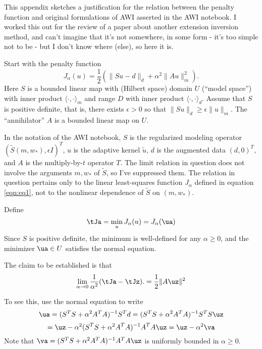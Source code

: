 This appendix sketches a justification for the relation between the penalty function and original formulations of AWI asserted in the AWI notebook. I worked this out for the review of a paper about another extension inversion method, and can't imagine that it's not somewhere, in some form - it's too simple not to be - but I don't know where (else), so here it is.

Start with the penalty function
\begin{equation}
  \label{eqn:eq1}
  J_{\alpha}(u) = \frac{1}{2}(\|Su-d\|_d + \alpha^2\|Au\|_m^2).
\end{equation}
Here $S$ is a bounded linear map with (Hilbert space) domain $U$ (``model space'') with inner product $\langle \cdot, \cdot \rangle_m$ and range $D$ with inner product $\langle \cdot, \cdot \rangle_d$. Assume that $S$ is positive definite, that is, there exists $\epsilon >0$ so that $\|Su\|_d \ge \epsilon\|u\|_m$. The ``annihilator'' $A$ is a bounded linear map on $U$.

In the notation of the AWI notebook, $S$ is the regularized modeling operator $(\tilde{S}(m,w_*),\epsilon I)^T$, $u$ is the adaptive kernel $\tilde{u}$, $d$ is the augmented data $(d,0)^T$,  and $A$ is the multiply-by-$t$ operator $T$. The limit relation in question does not involve the arguments $m, w_*$ of $\tilde{S}$, so I've suppressed them. The relation in question pertains only to the linear least-squares function $J_{\alpha}$ defined in equation \ref{eqn:eq1}, not to the nonlinear dependence of $\tilde{S}$ on $(m,w_*)$.

Define
\begin{equation}
  \label{eqn:eq0}
  \tJa = \min_u J_{\alpha}(u) = J_{\alpha}(\ua)
\end{equation}
Since $S$ is positive definite, the minimum is well-defined for any $\alpha \ge 0$, and the minimizer $\ua \in U$ satisfies the normal equation.

The claim to be established is that
\begin{equation}
  \label{eqn:eq4}
  \lim_{\alpha \rightarrow 0} \frac{1}{\alpha^2}  (\tJa-\tJz).= \frac{1}{2}\|A\uz\|^2
\end{equation}

To see this, use the normal equation to write
\[
  \ua = (S^TS + \alpha^2 A^TA)^{-1}S^Td = (S^TS + \alpha^2 A^TA)^{-1}S^TS \uz
\]
\begin{equation}
  \label{eqn:eq2}
  = \uz - \alpha^2 (S^TS + \alpha^2 A^TA)^{-1}A^TA\uz = \uz-\alpha^2 \va
\end{equation}
Note that $\va = (S^TS + \alpha^2 A^TA)^{-1}A^TA\uz$ is uniformly bounded in $\alpha \ge 0$.

